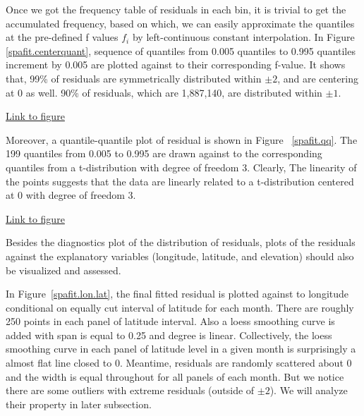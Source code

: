 Once we got the frequency table of residuals in each bin, it is trivial to get
the accumulated frequency, based on which, we can easily approximate the 
quantiles at the pre-defined f values $f_i$ by left-continuous constant 
interpolation. In Figure~
\href{../plots/a1950/spafit/d2/span0.015/a1950.residual.centerquant.pdf}
{\ref*{spafit.centerquant}}, sequence of quantiles from 0.005 quantiles to 0.995
quantiles increment by 0.005 are plotted against to their corresponding f-value.
It shows that, 99\% of residuals are symmetrically distributed within $\pm 2$, 
and are centering at 0 as well. 90\% of residuals, which are 1,887,140, are 
distributed within $\pm 1$.

\begin{framed}
\begin{center}
  \href{../plots/a1950/spafit/d2/span0.015/a1950.residual.centerquant.pdf}
  {Link to figure}
  \label{spafit.centerquant}
\end{center}
\end{framed}

Moreover, a quantile-quantile plot of residual is shown in Figure~
\href{../plots/a1950/spafit/d2/span0.015/a1950.residual.QQ.pdf}
{\ref*{spafit.qq}}. The 199 quantiles from 0.005 to 0.995 are drawn against to
the corresponding quantiles from a t-distribution with degree of freedom 3. 
Clearly, The linearity of the points suggests that the data are linearly related
to a t-distribution centered at 0 with degree of freedom 3.

\begin{framed}
\begin{center}
  \href{../plots/a1950/spafit/d2/span0.015/a1950.residual.QQ.pdf}
  {Link to figure}
  \label{spafit.qq}
\end{center}
\end{framed}

Besides the diagnostics plot of the distribution of residuals, plots of the 
residuals against the explanatory variables (longitude, latitude, and elevation)
should also be visualized and assessed.

In Figure~\href{../plots/a1950/spafit/d2/span0.015/a1950.spaResid.vs.lon.lat.pdf}
{\ref*{spafit.lon.lat}}, the final fitted residual is plotted against to longitude
conditional on equally cut interval of latitude for each month. There are roughly
250 points in each panel of latitude interval. Also a loess 
smoothing curve is added with span is equal to 0.25 and degree is linear. 
Collectively, the loess smoothing curve in each panel of latitude level in a given
month is surprisingly a almost flat line closed to 0. Meantime, residuals are
randomly scattered about 0 and the width is equal throughout for all panels of 
each month. But we notice there are some outliers with extreme residuals (outside
of $\pm 2$). We will analyze their property in later subsection.

